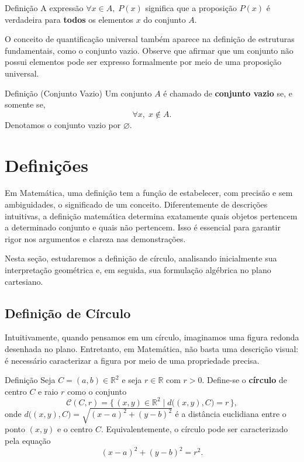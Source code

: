 \documentclass[12pt,a4paper,openright]{book}
\begin{document}
\begin{block}{Definição}
A expressão \(\forall x \in A,\; P(x)\) significa que a proposição \(P(x)\) é verdadeira para \textbf{todos} os elementos \(x\) do conjunto \(A\).
\end{block}

O conceito de quantificação universal também aparece na definição de estruturas fundamentais, como o conjunto vazio. Observe que afirmar que um conjunto não possui elementos pode ser expresso formalmente por meio de uma proposição universal.

\begin{block}{Definição (Conjunto Vazio)}
Um conjunto \(A\) é chamado de \textbf{conjunto vazio} se, e somente se,
\[
\forall x,\; x \notin A.
\]
Denotamos o conjunto vazio por \(\varnothing\).
\end{block}\section{Definições}

Em Matemática, uma definição tem a função de estabelecer, com precisão e sem ambiguidades, o significado de um conceito. Diferentemente de descrições intuitivas, a definição matemática determina exatamente quais objetos pertencem a determinado conjunto e quais não pertencem. Isso é essencial para garantir rigor nos argumentos e clareza nas demonstrações.

Nesta seção, estudaremos a definição de círculo, analisando inicialmente sua interpretação geométrica e, em seguida, sua formulação algébrica no plano cartesiano.

\subsection{Definição de Círculo}

Intuitivamente, quando pensamos em um círculo, imaginamos uma figura redonda desenhada no plano. Entretanto, em Matemática, não basta uma descrição visual: é necessário caracterizar a figura por meio de uma propriedade precisa.

\begin{block}{Definição}
Seja \(C = (a,b) \in \mathbb{R}^2\) e seja \(r \in \mathbb{R}\) com \(r > 0\). Define-se o \textbf{círculo} de centro \(C\) e raio \(r\) como o conjunto
\[
\mathcal{C}(C,r) = \{\, (x,y) \in \mathbb{R}^2 \mid d\big((x,y),C\big) = r \,\},
\]
onde \(d\big((x,y),C\big) = \sqrt{(x-a)^2 + (y-b)^2}\) é a distância euclidiana entre o ponto \((x,y)\) e o centro \(C\). Equivalentemente, o círculo pode ser caracterizado pela equação
\[
(x-a)^2 + (y-b)^2 = r^2.
\]
\end{block}
\end{document}
